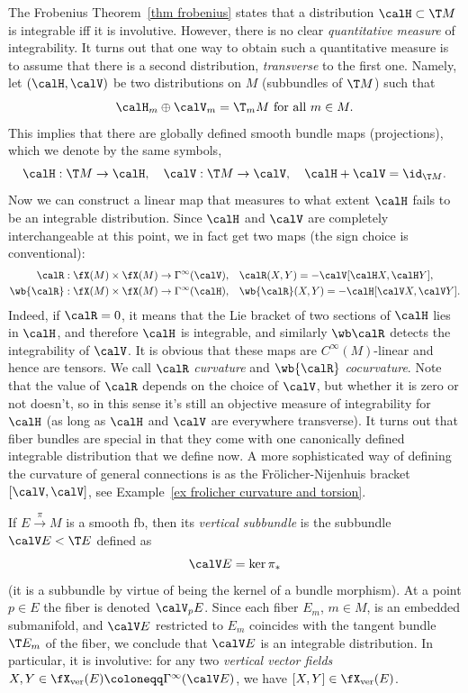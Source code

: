 The Frobenius Theorem~\ref{thm frobenius} states that a distribution $\calH\subset \T M$ is integrable iff it is involutive. However, there is no clear \emph{quantitative measure} of integrability. It turns out that one way to obtain such a quantitative measure is to assume that there is a second distribution, \emph{transverse} to the first one. Namely, let $(\calH,\calV)$ be two distributions on $M$ (subbundles of $\T M$) such that
\[\calH_m\oplus \calV_m=\T_mM \text{ for all }m\in M.\]
This implies that there are globally defined smooth bundle maps (projections), which we denote by the same symbols,
\[\calH:\T M\to \calH,\quad \calV:\T M\to \calV,\quad \calH+\calV=\id_{\T M}.\]
Now we can construct a linear map that measures to what extent $\calH$ fails to be an integrable distribution. Since $\calH$ and $\calV$ are completely interchangeable at this point, we in fact get two maps (the sign choice is conventional):
\begin{align}
    \calR:\fX(M)\times\fX(M)\to \Gamma^\infty(\calV),\quad & \calR(X,Y)=-\calV[\calH X,\calH Y],\\
    \wb{\calR}:\fX(M)\times\fX(M)\to \Gamma^\infty(\calH),\quad & \wb{\calR}(X,Y)=-\calH[\calV X,\calV Y].
\end{align}
Indeed, if $\calR=0$, it means that the Lie bracket of two sections of $\calH$ lies in $\calH$, and therefore $\calH$ is integrable, and similarly $\wb \calR$ detects the integrability of $\calV$. It is obvious that these maps are $C^\infty(M)$-linear and hence are tensors. We call $\calR$ \emph{curvature} and $\wb{\calR}$ \emph{cocurvature}. Note that the value of $\calR$ depends on the choice of $\calV$, but whether it is zero or not doesn't, so in this sense it's still an objective measure of integrability for $\calH$ (as long as $\calH$ and $\calV$ are everywhere transverse). It turns out that fiber bundles are special in that they come with one canonically defined integrable distribution that we define now. A more sophisticated way of defining the curvature of general connections is as the Fr\"olicher-Nijenhuis bracket $[\calV,\calV]$, see Example~\ref{ex frolicher curvature and torsion}.

\begin{defn}
    If $E\overset{\pi}{\to}M$ is a smooth \gls{fb}, then its \emph{vertical subbundle} is the subbundle $\calV E< \T E$ defined as 
    \[\calV E=\ker \pi_\ast\]
    (it is a subbundle by virtue of being the kernel of a bundle morphism). At a point $p\in E$ the fiber is denoted $\calV_pE$. Since each fiber $E_m$, $m\in M$, is an embedded submanifold, and $\calV E$ restricted to $E_m$ coincides with the tangent bundle $\T E_m$ of the fiber, we conclude that $\calV E$ is an integrable distribution. In particular, it is involutive: for any two \emph{vertical vector fields} $X,Y\in \fX_{\mathrm{ver}}(E)\coloneqq\Gamma^\infty(\calV E)$, we have $[X,Y]\in \fX_{\mathrm{ver}}(E)$.
\end{defn}

